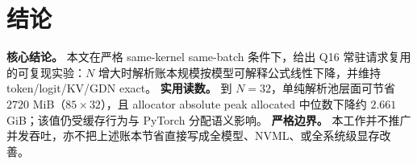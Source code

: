 \documentclass[11pt]{article}
\begin{document}
\section{结论}
\textbf{核心结论。} 本文在严格 same-kernel same-batch 条件下，给出 Q16 常驻请求复用的可复现实验：$N$ 增大时解析账本规模按模型可解释公式线性下降，并维持 token/logit/KV/GDN exact。  
\textbf{实用读数。} 到 $N=32$，单纯解析池层面可节省 $2720$ MiB（$85\times32$），且 allocator absolute peak allocated 中位数下降约 $2.661$ GiB；该值仍受缓存行为与 PyTorch 分配语义影响。  
\textbf{严格边界。} 本工作并不推广并发吞吐，亦不把上述账本节省直接写成全模型、NVML、或全系统级显存改善。
\end{document}
